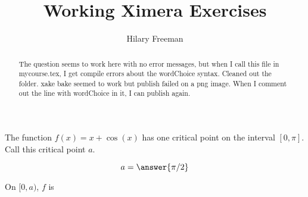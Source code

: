 \documentclass[handout]{ximera}
\title{Working Ximera Exercises}
\author{Hilary Freeman}
\begin{document}
\begin{abstract}
  The question seems to work here with no error messages, but when I call this file in mycourse.tex, I get compile errors about the wordChoice syntax.  Cleaned out the folder. xake bake seemed to work but publish failed on a png image. When I comment out the line with wordChoice in it, I can publish again.
\end{abstract}
\maketitle



\begin{exercise}
The function $f(x) =x+\cos(x)$ has one critical point on the interval $[0,\pi]$. Call this critical point $a$.

$$
a = \answer{\pi/2}
$$

On $[0,a)$, $f$ is 



\end{exercise}
\end{document}
